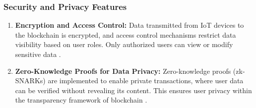 \documentclass[preprint,12pt]{elsarticle}
\begin{document}
\subsubsection{Security and Privacy Features}
\begin{enumerate}
    \item \textbf{Encryption and Access Control:}
Data transmitted from IoT devices to the blockchain is encrypted, and access control mechanisms restrict data visibility based on user roles. Only authorized users can view or modify sensitive data \citep{king2012ppcoin}.
    \item \textbf{Zero-Knowledge Proofs for Data Privacy:}
Zero-knowledge proofs (zk-SNARKs) are implemented to enable private transactions, where user data can be verified without revealing its content. This ensures user privacy within the transparency framework of blockchain \citep{sasson2014zerocash}.
\end{enumerate}
\end{document}
